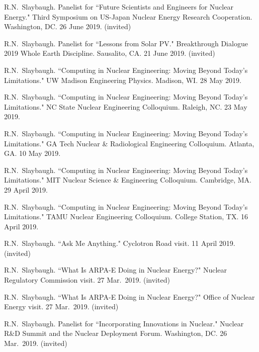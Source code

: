 \begin{bibsection}
\item R.N.\ Slaybaugh. Panelist for ``Future Scientists and Engineers for Nuclear Energy." Third Symposium on US-Japan Nuclear Energy Research Cooperation. Washington, DC. 26 June 2019. (invited)

\item R.N.\ Slaybaugh. Panelist for ``Lessons from Solar PV." Breakthrough Dialogue 2019 Whole Earth Discipline. Sausalito, CA. 21 June 2019. (invited)

\item R.N.\ Slaybaugh. ``Computing in Nuclear Engineering: Moving Beyond Today's Limitations." UW Madison Engineering Physics. Madison, WI. 28 May 2019.

\item R.N.\ Slaybaugh. ``Computing in Nuclear Engineering: Moving Beyond Today's Limitations." NC State Nuclear Engineering Colloquium. Raleigh, NC. 23 May 2019.


\item R.N.\ Slaybaugh. ``Computing in Nuclear Engineering: Moving Beyond Today's Limitations." GA Tech Nuclear \& Radiological Engineering Colloquium. Atlanta, GA. 10 May 2019.

\item R.N.\ Slaybaugh. ``Computing in Nuclear Engineering: Moving Beyond Today's Limitations." MIT Nuclear Science \& Engineering Colloquium. Cambridge, MA. 29 April 2019.

\item R.N.\ Slaybaugh. ``Computing in Nuclear Engineering: Moving Beyond Today's Limitations." TAMU Nuclear Engineering Colloquium. College Station, TX. 16 April 2019.

\item R.N.\ Slaybaugh. ``Ask Me Anything." Cyclotron Road visit. 11 April 2019. (invited)

\item R.N.\ Slaybaugh. ``What Is ARPA-E Doing in Nuclear Energy?" Nuclear Regulatory Commission visit. 27 Mar.\ 2019. (invited)

\item R.N.\ Slaybaugh. ``What Is ARPA-E Doing in Nuclear Energy?" Office of Nuclear Energy visit. 27 Mar.\ 2019. (invited)

\item R.N.\ Slaybaugh. Panelist for ``Incorporating Innovations in Nuclear." Nuclear R\&D Summit and the Nuclear Deployment Forum. Washington, DC. 26 Mar.\ 2019. (invited)


\end{bibsection}
